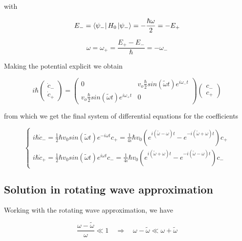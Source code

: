 \documentclass{article}
\begin{document}
with

\begin{equation}
E_- = \bra{\psi_-} H_0 \ket{\psi_-} = -\frac{\hbar \omega}{2} = - E_+
\end{equation}

\begin{equation}
\omega = \omega_+ = \frac{E_+ - E_-}{\hbar} = -\omega_-
\end{equation}

Making the potential explicit we obtain

\begin{equation}
i\hbar
  \begin{pmatrix}
    \dot{c}_- \\
    \dot{c}_+
  \end{pmatrix}
=
  \begin{pmatrix}
    0 & v_o \frac{\hbar}{2} sin(\tilde{\omega} t) e^{i \omega_- t} \\
    v_o \frac{\hbar}{2} sin(\tilde{\omega} t) e^{i \omega_+ t} & 0
  \end{pmatrix}
  \begin{pmatrix}
    c_- \\
    c_+
  \end{pmatrix}
\end{equation}

from which we get the final system of differential equations for the coefficients

\begin{equation}
\label{eq:c_diff_eq}
  \begin{cases} 
      i\hbar \dot{c}_- = \frac{1}{2} \hbar v_0 sin(\tilde{\omega}t) e^{-i \omega t} c_+ = \frac{1}{4i} \hbar v_0 \left( e^{i(\tilde{\omega}-\omega)t} - e^{-i(\tilde{\omega}+\omega)t} \right) c_+ \\
      i\hbar \dot{c}_+ = \frac{1}{2} \hbar v_0 sin(\tilde{\omega}t) e^{i \omega t} c_- = \frac{1}{4i} \hbar v_0 \left( e^{i(\tilde{\omega}+\omega)t} - e^{-i(\tilde{\omega}-\omega)t} \right) c_-
   \end{cases}
\end{equation}

\subsection{Solution in rotating wave approximation}
Working with the rotating wave approximation, we have

\begin{equation}
\frac{\omega-\tilde{\omega}}{\omega} \ll 1 \quad \Rightarrow \quad \omega - \tilde{\omega} \ll \omega + \tilde{\omega}
\end{equation}
\end{document}
